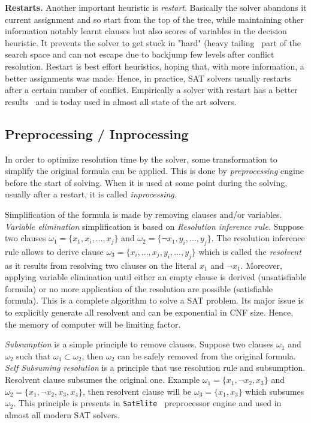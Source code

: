 \textbf{Restarts.}
Another important heuristic is \emph{restart}. Basically the solver abandons it current assignment and so 
start from the top of the tree, while maintaining other information notably learnt clauses but also scores of variables in the decision heuristic. 
It prevents the solver to get stuck in "hard" (heavy tailing~\cite{gomes1997heavy} part of the search space and can not escape due 
to backjump few levels after conflict resolution. Restart is best effort heuristics, hoping that,
with more information, a better assignments was made. Hence, in practice, SAT solvers usually restarts after a
certain number of conflict. Empirically a solver with restart has a better results~\cite{huang2007effect} and is today
used in almost all state of the art solvers.


\subsection{Preprocessing / Inprocessing}

In order to optimize resolution time by the solver, some transformation to simplify the original formula can be applied.
This is done by \emph{preprocessing} engine before the start of solving.
When it is used at some point during the solving, usually after a restart, it is called \emph{inprocessing}.

Simplification of the formula is made by removing clauses and/or variables.\\
\emph{Variable elimination} simplification is based on \emph{Resolution inference rule}.
Suppose two clauses	$\omega_1 = \{x_1, x_i, ..., x_j \}$ and $\omega_2 = \{\neg x_1, y_i, ..., y_j\}$.
The resolution inference rule allows to derive clause $\omega_3 = \{x_i, ..., x_j, y_i, ..., y_j\}$ which is called
the \emph{resolvent} as it results from resolving two clauses on the literal $x_1$ and $\neg x_1$.
Moreover,  applying variable elimination until either an empty clause is derived (unsatisfiable formula) or no more application of the resolution are possible (satisfiable formula). This is a complete algorithm to solve a SAT problem.
Its major issue is to explicitly generate all resolvent and can be exponential in CNF size.
Hence, the memory of computer will be limiting factor.


\emph{Subsumption} is a simple principle to remove clauses. Suppose two clauses $\omega_1$ and $\omega_2$ such that
$\omega_1 \subset  \omega_2$, then $\omega_2$ can be safely removed from the original formula.
\emph{Self Subsuming resolution} is a principle that use resolution rule and subsumption.
Resolvent clause subsumes the original one. Example $\omega_1 = \{x_1, \neg x_2, x_3\}$ and $\omega_2 = \{x_1, \neg x_2, x_3, x_4\}$, then resolvent clause will be $\omega_3 = \{x_1, x_3\}$ which subsumes $\omega_2$. This principle
is presents in \texttt{SatElite}~\cite{een2005effective} preprocessor engine and used in almost all modern SAT solvers.

